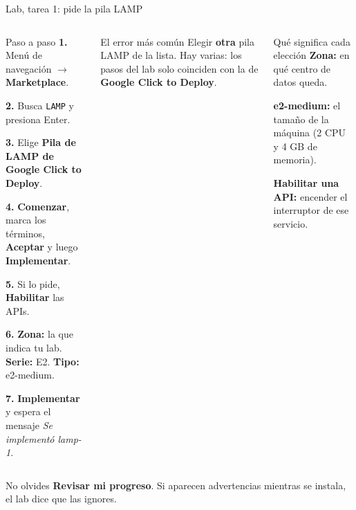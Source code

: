 \documentclass[aspectratio=169,10pt,c]{beamer}
\begin{document}
\begin{frame}{Lab, tarea 1: pide la pila LAMP}
\begin{columns}[T,onlytextwidth]
\begin{block}{Paso a paso}
\small
\textbf{1.} Menú de navegación $\rightarrow$ \textbf{Marketplace}.\par\smallskip
\textbf{2.} Busca \texttt{LAMP} y presiona Enter.\par\smallskip
\textbf{3.} Elige \textbf{Pila de LAMP de Google Click to Deploy}.\par\smallskip
\textbf{4.} \textbf{Comenzar}, marca los términos, \textbf{Aceptar} y luego \textbf{Implementar}.\par\smallskip
\textbf{5.} Si lo pide, \textbf{Habilitar} las APIs.\par\smallskip
\textbf{6.} \textbf{Zona:} la que indica tu lab. \textbf{Serie:} E2. \textbf{Tipo:} e2-medium.\par\smallskip
\textbf{7.} \textbf{Implementar} y espera el mensaje \emph{Se implementó lamp-1}.
\end{block}
\begin{alertblock}{El error más común}
\small Elegir \textbf{otra} pila LAMP de la lista. Hay varias: los pasos del lab solo coinciden con la de \textbf{Google Click to Deploy}.
\end{alertblock}
\begin{exampleblock}{Qué significa cada elección}
\small
\textbf{Zona:} en qué centro de datos queda.\par
\textbf{e2-medium:} el tamaño de la máquina (2 CPU y 4 GB de memoria).\par
\textbf{Habilitar una API:} encender el interruptor de ese servicio.
\end{exampleblock}
\end{columns}
\par\vspace{1mm}
\begin{block}{No olvides}
\small \textbf{Revisar mi progreso}. Si aparecen advertencias mientras se instala, el lab dice que las ignores.
\end{block}
\end{frame}
\end{document}
